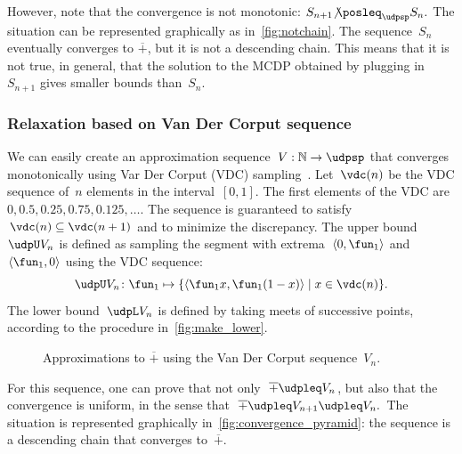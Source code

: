 However, note that the convergence is not monotonic: $S_{n+1}{\not\posleq}_{\udpsp}S_{n}.$
The situation can be represented graphically as in~\cref{fig:notchain}.
The sequence~$S_{n}$ eventually converges to $\overline{+}$, but
it is not a descending chain. This means that it is not true, in general,
that the solution to the MCDP obtained by plugging in~$S_{n+1}$
gives smaller bounds than~$S_{n}$.

\subsubsection*{Relaxation based on Van Der Corput sequence}

We can easily create an approximation sequence~$V:\mathbb{N}\rightarrow\udpsp$
that converges monotonically using Var Der Corput (VDC) sampling~\cite[Section 5.2]{LaValle2006Planning}.
Let~$\vdc(n)$ be the VDC sequence of~$n$ elements in the interval~$[0,1]$.
The first elements of the VDC are $0,0.5,0.25,0.75,0.125,\dots$.
The sequence is guaranteed to satisfy~$\vdc(n)\subseteq\vdc(n+1)$
and to minimize the discrepancy. The upper bound~$\udpU V_{n}$
is defined as sampling the segment with extrema~$\left\langle 0,\fun_{1}\right\rangle $
and~$\left\langle \fun_{1},0\right\rangle $ using the VDC sequence:
\[
\udpU V_{n}\colon\fun_{1}\mapsto\{\left\langle \fun_{1}x,\fun_{1}(1-x)\right\rangle \mid x\in\vdc(n)\}.
\]
 The lower bound~$\udpL V_{n}$ is defined by taking meets of successive
points, according to the procedure in~\cref{fig:make_lower}.
\begin{center}
\begin{figure}[h]
\begin{centering}
\par\end{centering}
\caption{\label{fig:Vn}Approximations to $\overline{+}$ using the Van Der
Corput sequence~$V_{n}$.}
\end{figure}
\par\end{center}

For this sequence, one can prove that not only~$\overline{+}\udpleq V_{n}$,
but also that the convergence is uniform, in the sense that~$\overline{+}\udpleq V_{n+1}\udpleq V_{n}.$
The situation is represented graphically in~\cref{fig:convergence_pyramid}:
the sequence is a descending chain that converges to~$\overline{+}$.

